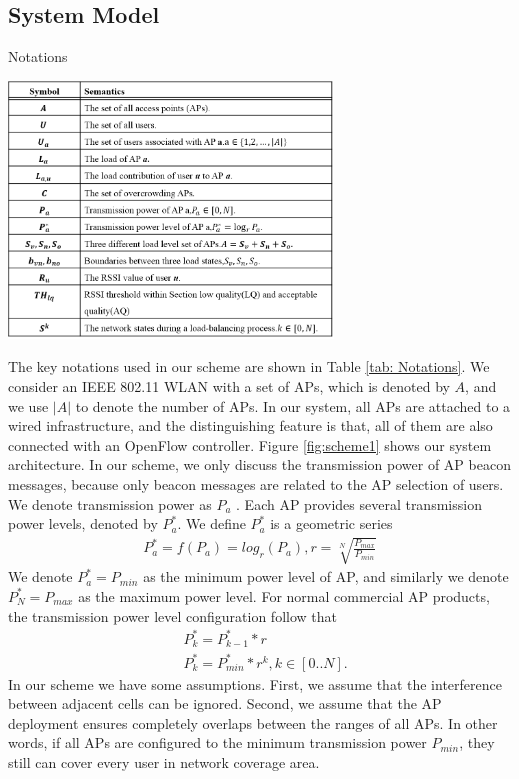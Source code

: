 
\subsection{System Model}\label{section:3.1}
\begin{table}[tbp]
\setlength{\belowcaptionskip}{15pt}
\centering
\caption{Notations}
\label{tab: Notations}
\includegraphics[width=3.4in]{images/notations.png}
\end{table}

The key notations used in our scheme are shown in Table \ref{tab: Notations}. We consider an IEEE 802.11 WLAN with a set of APs, which is denoted by $A$, and we use $|A|$ to denote the number of APs. In our system, all APs are attached to a wired infrastructure, and the distinguishing feature is that, all of them are also connected with an OpenFlow controller. Figure \ref{fig:scheme1} shows our system architecture. In our scheme, we only discuss the transmission power of AP beacon messages, because only beacon messages are related to the AP selection of users. We denote transmission power as $P_a$  . Each AP provides several transmission power levels, denoted by $P_a^*$. We define $P_a^*$ is a geometric series
\begin{eqnarray}
{P_a^*}=f({P_a})=log _r⁡\left({P_a} \right)  ,  r=\sqrt[N]{\frac{P_{max}}{P_{min}}}
\end{eqnarray}
We denote $P_a^*=P_{min}$ as the minimum power level of AP, and similarly we denote $P_N^*=P_{max}$ as the maximum power level. For normal commercial AP products, the transmission power level configuration follow that
\begin{align}
&P_k^*={P_{k-1}^*}*r\\										
&P_k^*={P_{min}^*}*{r^k}, k\in[0..N].							
\end{align}
In our scheme we have some assumptions. First, we assume that the interference between adjacent cells can be ignored. Second, we assume that the AP deployment ensures completely overlaps between the ranges of all APs. In other words, if all APs are configured to the minimum transmission power $P_{min}$, they still can cover every user in network coverage area.

